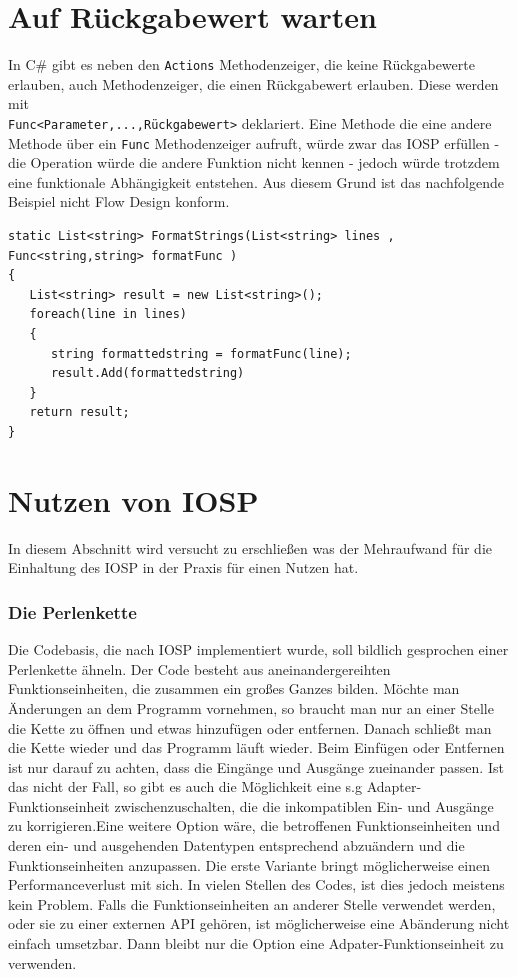 \section{Auf Rückgabewert warten}

In C\# gibt es neben den \texttt{Actions} Methodenzeiger, die keine Rückgabewerte 
erlauben, auch Methodenzeiger, die einen Rückgabewert erlauben.
Diese werden mit\\\texttt{Func<Parameter,...,Rückgabewert>} deklariert.
Eine Methode die eine andere Methode über ein \texttt{Func} Methodenzeiger aufruft,
würde zwar das IOSP erfüllen - die Operation würde die andere Funktion nicht
kennen - jedoch würde trotzdem eine funktionale Abhängigkeit entstehen.
Aus diesem Grund ist das nachfolgende Beispiel nicht Flow Design konform.

\begin{lstlisting}[caption=Auf Rückgabewert warten]
static List<string> FormatStrings(List<string> lines , Func<string,string> formatFunc )
{
   List<string> result = new List<string>();
   foreach(line in lines)
   {
      string formattedstring = formatFunc(line);
      result.Add(formattedstring)
   }
   return result;
}
\end{lstlisting}


\section{Nutzen von IOSP}

In diesem Abschnitt wird versucht zu erschließen was der Mehraufwand für die
Einhaltung des IOSP in der Praxis für einen Nutzen hat.
\subsubsection{Die Perlenkette}

Die Codebasis, die nach IOSP implementiert wurde, soll bildlich gesprochen einer
Perlenkette ähneln. Der Code besteht aus aneinandergereihten Funktionseinheiten,
die zusammen ein großes Ganzes bilden. Möchte man Änderungen an dem Programm
vornehmen, so braucht man nur an einer Stelle die Kette zu öffnen und etwas
hinzufügen oder entfernen. Danach schließt man die Kette wieder und das Programm
läuft wieder. Beim Einfügen oder Entfernen ist nur darauf zu achten, dass die
Eingänge und Ausgänge zueinander passen. Ist das nicht der Fall, so gibt es auch
die Möglichkeit eine s.g Adapter-Funktionseinheit zwischenzuschalten, die die inkompatiblen
Ein- und Ausgänge zu korrigieren.Eine weitere Option wäre, die betroffenen
Funktionseinheiten und deren
ein- und ausgehenden Datentypen entsprechend abzuändern und die
Funktionseinheiten anzupassen.
Die erste Variante bringt möglicherweise einen Performanceverlust mit sich.
In vielen Stellen des Codes, ist dies jedoch meistens kein Problem.
Falls die Funktionseinheiten an anderer Stelle verwendet werden, oder sie zu
einer externen API gehören, ist möglicherweise eine Abänderung nicht
einfach umsetzbar. Dann bleibt nur die Option eine Adpater-Funktionseinheit zu verwenden.

